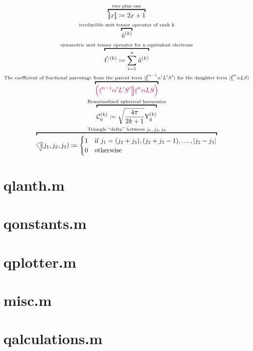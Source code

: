 \documentclass{article}
\begin{document}
\begin{gather} 
    \overbracket{\tpobraket{x} \DEF 2x+1}^{\text{two plus one}} \\
    \overbracket{\op{u}^{(k)}}^{\text{irreducible unit tensor operator of rank k}} \\ 
    \overbracket{\op{U}^{(k)} \DEF \sum_{i=1}^{n} \op{u}^{(k)} }^{\text{symmetric unit tensor operator for n equivalent electrons}} \\
    \overbracket{\cfp{\lorb^{n-1}\alpha'L'S'}{\lorb^n\alpha{L}{S}}}^{\text{The coefficient of fractional parentage from the parent term }\ket{\lorb^{n-1}\alpha'{L'S'}}\text{ for the daughter term }\ket{\lorb^{n}\alpha{LS}}} \\
    \overbracket{\Ckq \DEF \sqrt{\frac{4\pi}{2k+1}} \Ykq}^{\text{Renormalized spherical harmonics}} \\
    \overbracket{\tricondition{j_1,j_2,j_3} \DEF
    \begin{cases} 
        1 & \text{if } j_1 = (j_2 + j_3), (j_2 + j_3 - 1), \ldots, |j_2-j_3|\\
        0 & \text{otherwise}
        \end{cases}}^{\text{Triangle ``delta'' between $j_1,j_2,j_3$}} 
\end{gather}

\newpage
\section{qlanth.m}



\section{qonstants.m} 



\section{qplotter.m}



\section{misc.m}




\section{qalculations.m}



\printbibliography
\end{document}
